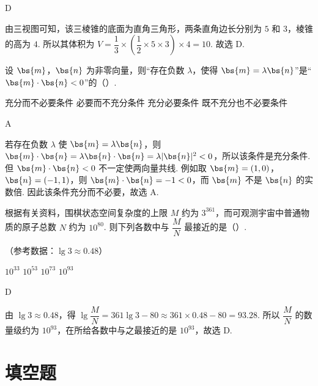 \begin{answer}
D
\end{answer}

\begin{solution}
由三视图可知，该三棱锥的底面为直角三角形，两条直角边长分别为 \(5\) 和 \(3\)，棱锥的高为 \(4\). 所以其体积为
\(V=\dfrac13\times\left(\dfrac12\times5\times3\right)\times4=10\).
故选 D.
\end{solution}

\begin{problem}
设 \(\bs{m}\)，\(\bs{n}\) 为非零向量，则“存在负数 \(\lambda\)，使得 \(\bs{m}=\lambda\bs{n}\)”是“\(\bs{m}\cdot\bs{n}<0\)”的（\quad）.

\choices
    {充分而不必要条件}
    {必要而不充分条件}
    {充分必要条件}
    {既不充分也不必要条件}
\end{problem}

\begin{answer}
A
\end{answer}

\begin{solution}
若存在负数 \(\lambda\) 使 \(\bs{m}=\lambda\bs{n}\)，则
\(\bs{m}\cdot\bs{n}=\lambda\bs{n}\cdot\bs{n}=\lambda\lvert\bs{n}\rvert^2<0\)，所以该条件是充分条件.
但 \(\bs{m}\cdot\bs{n}<0\) 不一定使两向量共线. 例如取 \(\bs{m}=(1,0)\)，\(\bs{n}=(-1,1)\)，则 \(\bs{m}\cdot\bs{n}=-1<0\)，而 \(\bs{m}\) 不是 \(\bs{n}\) 的实数倍. 因此该条件充分而不必要，故选 A.
\end{solution}

\begin{problem}
根据有关资料，围棋状态空间复杂度的上限 \(M\) 约为 \(3^{361}\)，而可观测宇宙中普通物质的原子总数 \(N\) 约为 \(10^{80}\). 则下列各数中与 \(\dfrac{M}{N}\) 最接近的是（\quad）.

（参考数据：\(\lg 3\approx0.48\)）

\choices
    {\(10^{33}\)}
    {\(10^{53}\)}
    {\(10^{73}\)}
    {\(10^{93}\)}
\end{problem}

\begin{answer}
D
\end{answer}

\begin{solution}
由 \(\lg3\approx0.48\)，得
\(\lg\dfrac{M}{N}=361\lg3-80\approx361\times0.48-80=93.28\).
所以 \(\dfrac{M}{N}\) 的数量级约为 \(10^{93}\)，在所给各数中与之最接近的是 \(10^{93}\)，故选 D.
\end{solution}

\section{填空题}

